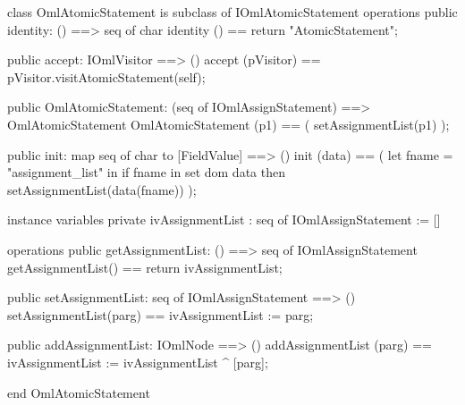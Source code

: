 \begin{vdm_al}
class OmlAtomicStatement is subclass of IOmlAtomicStatement
operations
  public identity: () ==> seq of char
  identity () == return "AtomicStatement";

  public accept: IOmlVisitor ==> ()
  accept (pVisitor) == pVisitor.visitAtomicStatement(self);

  public OmlAtomicStatement:
      (seq of IOmlAssignStatement) ==> OmlAtomicStatement
  OmlAtomicStatement (p1) == 
   ( setAssignmentList(p1) );

  public init: map seq of char to [FieldValue] ==> ()
  init (data) ==
    ( let fname = "assignment_list" in
        if fname in set dom data
        then setAssignmentList(data(fname)) );

instance variables
  private ivAssignmentList : seq of IOmlAssignStatement := []

operations
  public getAssignmentList: () ==> seq of IOmlAssignStatement
  getAssignmentList() == return ivAssignmentList;

  public setAssignmentList: seq of IOmlAssignStatement ==> ()
  setAssignmentList(parg) == ivAssignmentList := parg;

  public addAssignmentList: IOmlNode ==> ()
  addAssignmentList (parg) == ivAssignmentList := ivAssignmentList ^ [parg];

end OmlAtomicStatement
\end{vdm_al}

